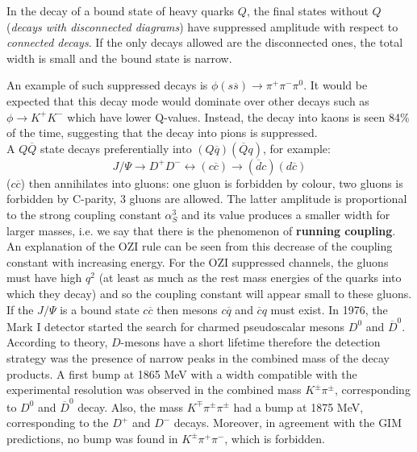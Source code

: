 \documentclass[10.75pt,a4paper,openright,bottom=2cm]{article}
\newcommand{\beginbox}[1]{\begin{tcolorbox}[width=\textwidth,colback={yellow!50},title={#1},colbacktitle={gray!50},coltitle=black]}
\renewcommand{\endbox}{\end{tcolorbox}\noindent}
\begin{document}
\beginbox{Zweig (OZI) Rule}
In the decay of a bound state of heavy quarks $Q$, the final states without $Q$ (\textit{decays with disconnected diagrams}) have suppressed amplitude with respect to \textit{connected decays}. If the only decays allowed are the disconnected ones, the total width is small and the bound state is narrow.
\endbox
An example of such suppressed decays is $\phi(s\overline{s})\to\pi^+\pi^-\pi^0$. It would be expected that this decay mode would dominate over other decays such as $\phi\to K^+K^-$ which have lower Q-values. Instead, the decay into kaons is seen 84\% of the time, suggesting that the decay into pions is suppressed.\\
A $Q\overline{Q}$ state decays preferentially into $(Q\overline{q})(\overline{Q}q)$, for example:
\[
J/\Psi\to D^+D^- \longleftrightarrow (c\overline{c})\to(\overline{d}c)(d\overline{c})
\]
($c\overline{c}$) then annihilates into gluons: one gluon is forbidden by colour, two gluons is forbidden by C-parity, 3 gluons are allowed. The latter amplitude is proportional to the strong coupling constant $\alpha_S^3$ and its value produces a smaller width for larger masses, i.e. we say that there is the phenomenon of \textbf{running coupling}.\\
An explanation of the OZI rule can be seen from this decrease of the coupling constant with increasing energy. For the OZI suppressed channels, the gluons must have high $q^2$ (at least as much as the rest mass energies of the quarks into which they decay) and so the coupling constant will appear small to these gluons.\\
If the $J/\Psi$ is a bound state $c\overline{c}$ then mesons $c\overline{q}$ and $\overline{c}q$ must exist. In 1976, the Mark I detector started the search for charmed pseudoscalar mesons $D^0$ and $\overline{D}^0$. According to theory, $D$-mesons have a short lifetime therefore the detection strategy was the presence of narrow peaks in the combined mass of the decay products. A first bump at 1865 MeV with a width compatible with the experimental resolution was observed in the combined mass $K^\pm\pi^\pm$, corresponding to $D^0$ and $\overline{D}^0$ decay. Also, the mass $K^\mp\pi^\pm\pi^\pm$ had a bump at 1875 MeV, corresponding to the $D^+$ and $D^-$ decays. Moreover, in agreement with the GIM predictions, no bump was found in $K^\pm\pi^+\pi^-$, which is forbidden.
\end{document}
